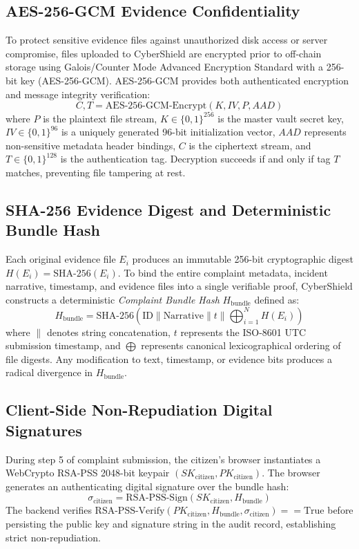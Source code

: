 \documentclass[conference]{IEEEtran}
\begin{document}
\subsection{AES-256-GCM Evidence Confidentiality}
To protect sensitive evidence files against unauthorized disk access or server compromise, files uploaded to CyberShield are encrypted prior to off-chain storage using Galois/Counter Mode Advanced Encryption Standard with a 256-bit key (AES-256-GCM). AES-256-GCM provides both authenticated encryption and message integrity verification:
\begin{equation}
C, T = \text{AES-256-GCM-Encrypt}(K, IV, P, AAD)
\end{equation}
where $P$ is the plaintext file stream, $K \in \{0,1\}^{256}$ is the master vault secret key, $IV \in \{0,1\}^{96}$ is a uniquely generated 96-bit initialization vector, $AAD$ represents non-sensitive metadata header bindings, $C$ is the ciphertext stream, and $T \in \{0,1\}^{128}$ is the authentication tag. Decryption succeeds if and only if tag $T$ matches, preventing file tampering at rest.

\subsection{SHA-256 Evidence Digest and Deterministic Bundle Hash}
Each original evidence file $E_i$ produces an immutable 256-bit cryptographic digest $H(E_i) = \text{SHA-256}(E_i)$. To bind the entire complaint metadata, incident narrative, timestamp, and evidence files into a single verifiable proof, CyberShield constructs a deterministic \textit{Complaint Bundle Hash} $H_{\text{bundle}}$ defined as:
\begin{equation}
H_{\text{bundle}} = \text{SHA-256}\left( \text{ID} \parallel \text{Narrative} \parallel t \parallel \bigoplus_{i=1}^{N} H(E_i) \right)
\end{equation}
where $\parallel$ denotes string concatenation, $t$ represents the ISO-8601 UTC submission timestamp, and $\bigoplus$ represents canonical lexicographical ordering of file digests. Any modification to text, timestamp, or evidence bits produces a radical divergence in $H_{\text{bundle}}$.

\subsection{Client-Side Non-Repudiation Digital Signatures}
During step 5 of complaint submission, the citizen's browser instantiates a WebCrypto RSA-PSS 2048-bit keypair $(SK_{\text{citizen}}, PK_{\text{citizen}})$. The browser generates an authenticating digital signature over the bundle hash:
\begin{equation}
\sigma_{\text{citizen}} = \text{RSA-PSS-Sign}(SK_{\text{citizen}}, H_{\text{bundle}})
\end{equation}
The backend verifies $\text{RSA-PSS-Verify}(PK_{\text{citizen}}, H_{\text{bundle}}, \sigma_{\text{citizen}}) == \text{True}$ before persisting the public key and signature string in the audit record, establishing strict non-repudiation.
\end{document}
